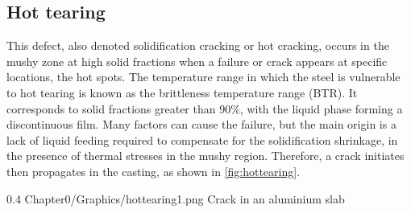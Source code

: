 \subsection*{Hot tearing} 
This defect, also denoted solidification cracking or hot cracking, occurs in the mushy zone at high solid fractions when a failure
or crack appears at specific locations, the hot spots. The temperature range in which the steel is vulnerable to hot tearing is known as the brittleness temperature range (BTR). It corresponds to solid fractions greater than \num{90}\%, with the liquid phase forming a discontinuous film. Many factors can cause the failure, but the main origin is a lack of liquid feeding required to compensate for the solidification shrinkage, in the presence of thermal stresses in the mushy region. Therefore, a crack initiates then propagates in the casting, as shown in \cref{fig:hottearing}. 
\begin{figureth}
{0.4}
{Chapter0/Graphics/hottearing1.png}
{Crack in an aluminium slab}
\label{fig:hottearing}
\end{figureth}
